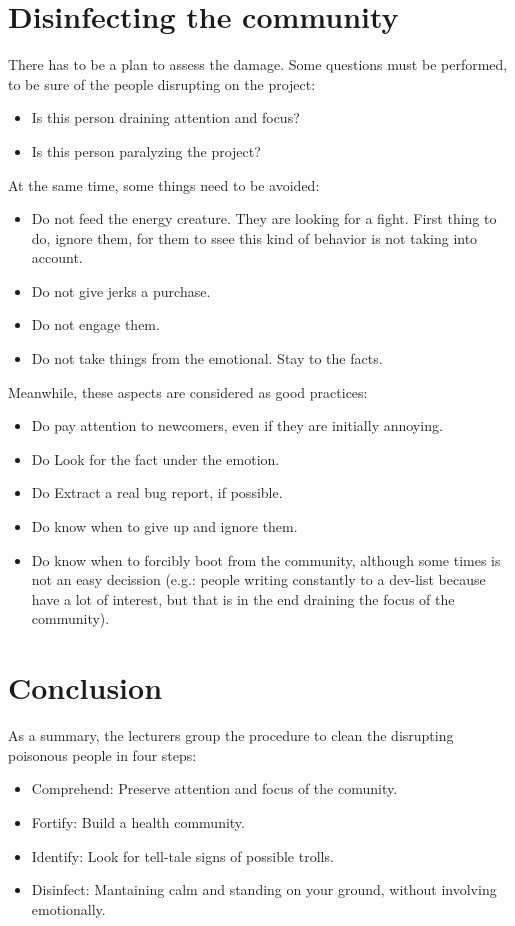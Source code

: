 \documentclass[11pt]{article}
\begin{document}
\section{Disinfecting the community}
There has to be a plan to assess the damage. Some questions must be performed, to be sure of the people disrupting on the project:
\begin{itemize}\itemsep0pt
\item{Is this person draining attention and focus?}
\item{Is this person paralyzing the project?}
\end{itemize}
At the same time, some things need to be avoided:
\begin{itemize}\itemsep0pt
\item{Do not feed the energy creature. They are looking for a fight. First thing to do, ignore them, for them to ssee this kind of behavior is not taking into account.}
\item{Do not give jerks a purchase.}
\item{Do not engage them.}
\item{Do not take things from the emotional. Stay to the facts.}
\end{itemize}
Meanwhile, these aspects are considered as good practices:
\begin{itemize}\itemsep0pt
\item{Do pay attention to newcomers, even if they are initially annoying.}
\item{Do Look for the fact under the emotion.}
\item{Do Extract a real bug report, if possible.}
\item{Do know when to give up and ignore them.}
\item{Do know when to forcibly boot from the community, although some times is not an easy decission (e.g.: people writing constantly to a dev-list because have a lot of interest, but that is in the end draining the focus of the community).}
\end{itemize}

\section{Conclusion}
As a summary, the lecturers group the procedure to clean the disrupting poisonous people in four steps:
\begin{itemize}\itemsep0pt
\item{Comprehend}: Preserve attention and focus of the comunity.
\item{Fortify}: Build a health community.
\item{Identify}: Look for tell-tale signs of possible trolls.
\item{Disinfect}: Mantaining calm and standing on your ground, without involving emotionally.
\end{itemize}
\end{document}
